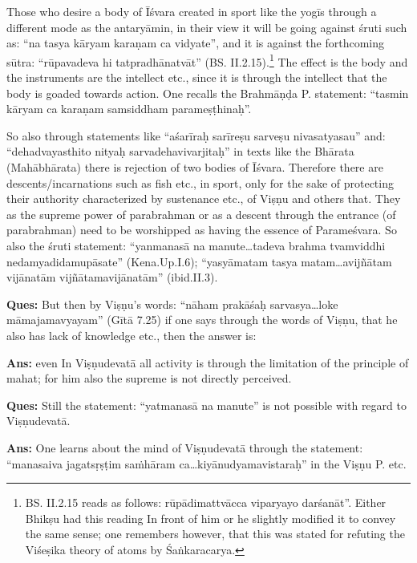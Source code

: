 Those who desire a body of Īśvara created in sport like the yogīs through a different mode as the antaryāmin, in their view it will be going against śruti such as: “na tasya kāryam karaṇam ca vidyate”, and it is against the forthcoming sūtra: “rūpavadeva hi tatpradhānatvāt” (BS. II.2.15).\footnote{BS. II.2.15 reads as follows: rūpādimattvācca viparyayo darśanāt”. Either Bhikṣu had this reading In front of him or he slightly modified it to convey the same sense; one remembers however, that this was stated for refuting the Viśeṣika theory of atoms by Śaṅkaracarya.} The effect is the body and the instruments are the intellect etc., since it is through the intellect that the body is goaded towards action. One recalls the Brahmāṇḍa P. statement: “tasmin kāryam ca karaṇam samsiddham parameṣṭhinaḥ”.

So also through statements like “aśarīraḥ sarīreṣu sarveṣu nivasatyasau” and: “dehadvaya\-sthito nityaḥ sarvadehavivarjitaḥ” in texts like the Bhārata (Mahābhārata) there is rejection of two bodies of Īśvara.  Therefore there are descents/\-incarnations such as fish etc., in sport, only for the sake of protecting their authority characterized by sustenance etc., of Viṣṇu and others that. They as the supreme power of parabrahman or as a descent through the entrance (of parabrahman) need to be worshipped as having the essence of Parameśvara. So also the śruti statement: “yanmanasā na manute…tadeva brahma tvamviddhi nedam\break yadidamu\-pā\-sate” (Kena.Up.I.6); “yasyāmatam tasya matam…avijñātam vijānatām vijñātamavijānatām” (ibid.II.3).

\textbf{Ques:} But then by Viṣṇu’s words: “nāham prakāśaḥ sarvasya…loke māmajamavyayam” (Gītā 7.25) if one says through the words of Viṣṇu, that he also has lack of knowledge etc., then the answer is: 

\textbf{Ans:} even In Viṣṇudevatā all activity is through the limitation of the principle of mahat; for him also the supreme is not directly perceived.  

\textbf{Ques:} Still the statement: “yatmanasā na manute” is not possible with regard to Viṣṇudevatā. 

\textbf{Ans:} One learns about the mind of Viṣṇudevatā through the statement: “manasaiva jagatsṛṣṭim saṁhāram ca…kiyānudyamavistaraḥ” in the Viṣṇu P. etc. 

\vskip 2pt

